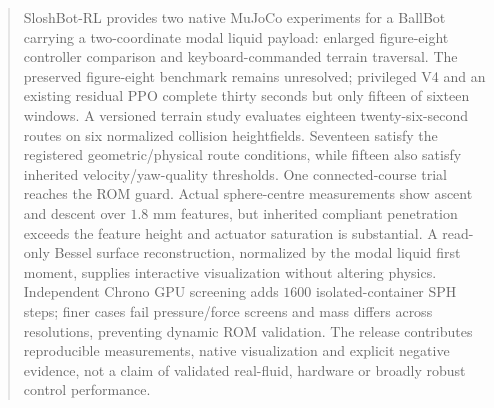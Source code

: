 \begin{abstract}
SloshBot-RL provides two native MuJoCo experiments for a BallBot carrying a two-coordinate modal liquid payload: enlarged figure-eight controller comparison and keyboard-commanded terrain traversal. The preserved figure-eight benchmark remains unresolved; privileged V4 and an existing residual PPO complete thirty seconds but only fifteen of sixteen windows. A versioned terrain study evaluates eighteen twenty-six-second routes on six normalized collision heightfields. Seventeen satisfy the registered geometric/physical route conditions, while fifteen also satisfy inherited velocity/yaw-quality thresholds. One connected-course trial reaches the ROM guard. Actual sphere-centre measurements show ascent and descent over $1.8$ mm features, but inherited compliant penetration exceeds the feature height and actuator saturation is substantial. A read-only Bessel surface reconstruction, normalized by the modal liquid first moment, supplies interactive visualization without altering physics. Independent Chrono GPU screening adds $1600$ isolated-container SPH steps; finer cases fail pressure/force screens and mass differs across resolutions, preventing dynamic ROM validation. The release contributes reproducible measurements, native visualization and explicit negative evidence, not a claim of validated real-fluid, hardware or broadly robust control performance.
\end{abstract}
